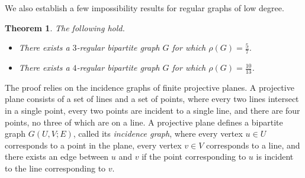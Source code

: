 \documentclass[11pt]{article}
\numberwithin{equation}{section}
\newtheorem{theorem}{Theorem}[section]
\theoremstyle{definition}
\theoremstyle{plain}
\theoremstyle{plain}
\begin{document}
%
%
%
%

%
%
%
%

%
%
%
%
%
%
%

We also establish a few impossibility results for regular graphs of low degree.

\begin{theorem}
	The following hold.  %
	\begin{itemize}
		\item There exists a $3$-regular bipartite graph $G$ for which $\rho(G) = \frac{5}{7}$.
		\item There exists a $4$-regular bipartite graph $G$ for which $\rho(G) = \frac{10}{13}$.
	\end{itemize}
	\label{thm:imposs-projective}
\end{theorem}

%
%
%
The proof relies on %
the incidence graphs of finite  %
projective planes.
A projective plane consists of a set of lines and a set of points, where
%
every two lines intersect in a single point, %
every two points are incident to a single line,
and there are four points, no three of which are on a line.  %
A projective plane %
defines %
a bipartite graph $G(U,V;E)$,
called its \emph{incidence graph},  %
where every vertex $u \in U$ corresponds to a point in the plane, every vertex $v \in V$ corresponds to a line, and there exists an edge between $u$ and $v$ if the point corresponding to $u$ is incident to the line corresponding to $v$.
\end{document}

